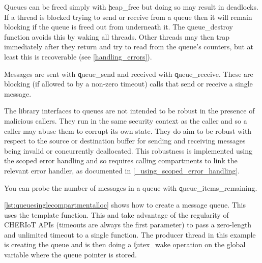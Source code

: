 
Queues can be freed simply with \c{heap_free} but doing so may result in deadlocks.
If a thread is blocked trying to send or receive from a queue then it will remain blocking if the queue is freed out from underneath it.
The \c{queue_destroy} function avoids this by waking all threads.
Other threads may then trap immediately after they return and try to read from the queue's counters, but at least this is recoverable (see \ref{handling_errors}).


Messages are sent with \c{queue_send} and received with \c{queue_receive}.
These are blocking (if allowed to by a non-zero timeout) calls that send or receive a single message.



\begin{caution}
The library interfaces to queues are not intended to be robust in the presence of malicious callers.
They run in the same security context as the caller and so a caller may abuse them to corrupt its own state.
They do aim to be robust with respect to the source or destination buffer for sending and receiving messages being invalid or concurrently deallocated.
This robustness is implemented using the scoped error handling and so requires calling compartments to link the relevant error handler, as documented in \ref{_using_scoped_error_handling}.
\end{caution}

You can probe the number of messages in a queue with \c{queue_items_remaining}.


\ref{lst:queuesinglecompartmentalloc} shows how to create a message queue.
This uses the  template function.
This and  take advantage of the regularity of CHERIoT APIs (timeouts are always the first parameter) to pass a zero-length and unlimited timeout to a single function.
The producer thread in this example is creating the queue and is then doing a \c{futex_wake} operation on the global variable where the queue pointer is stored.

\codelisting[filename=examples/producer_consumer/queue.cc,marker=allocate,label=lst:queuesinglecompartmentalloc,caption="Allocating a message queue for use in a single compartment"]{}

